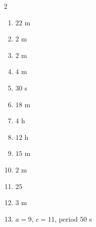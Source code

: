 \documentclass[11pt]{article}
\begin{document}
\begin{keybox}
\begin{multicols}{2}
\small
\begin{enumerate}[leftmargin=*,itemsep=3pt]
  \item $22$ m
  \item $2$ m
  \item $2$ m
  \item $4$ m
  \item $30$ s
  \item $18$ m
  \item $4$ h
  \item $12$ h
  \item $15$ m
  \item $2$ m
  \item $25$
  \item $3$ m
  \item $a=9$, $c=11$, period $50$ s
\end{enumerate}
\end{multicols}
\end{keybox}
\end{document}
